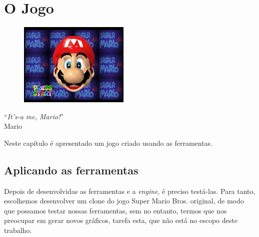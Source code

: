 \documentclass[brazil]{abnt}
\begin{document}
\chapter{O Jogo}

\vfill{}
\begin{flushright}{}
\begin{figure}[h!]
\hfill\includegraphics{imgs/mario.jpg}
\end{figure}
``\emph{It’s-a me, Mario!}''\\
{\small Mario}\end{flushright}{\small \par}
\vfill{}

Neste capítulo é apresentado um jogo criado usando as ferramentas.
\newpage

\section{Aplicando as ferramentas}

Depois de desenvolvidas as ferramentas e a \textit{engine}, é preciso testá-las. Para tanto, escolhemos desenvolver um clone do jogo Super Mario Bros. original, de modo que possamos testar nossas ferramentas, sem no entanto, termos que nos preocupar em gerar novos gráficos, tarefa esta, que não está no escopo deste trabalho.
\end{document}
